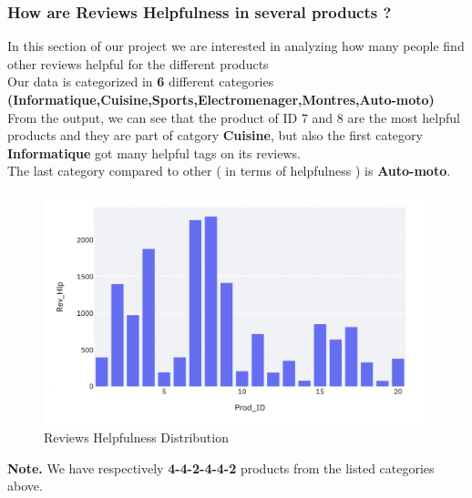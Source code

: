 \documentclass{article}
\begin{document}
\subsubsection{How are Reviews Helpfulness in several products ? }
In this section of our project we are interested in analyzing how many people find other reviews helpful for the different products\\
Our data is categorized in \textbf{6} different categories
\textbf{(Informatique,Cuisine,Sports,Electromenager,Montres,Auto-moto)}\\
From the output, we can see that the product of ID 7 and 8 are the most helpful products and they are part of catgory \textbf{Cuisine}, but also the first category \textbf{Informatique} got many helpful tags on its reviews.\\
The last category compared to other ( in terms of helpfulness ) is \textbf{Auto-moto}.
\begin{figure}[H]
    \centering
    \includegraphics[scale=0.55]{src/img/prod_rev_hlp.png}
    \caption{Reviews Helpfulness Distribution}
    \label{fig:my_label}
\end{figure}
\textbf{Note.} We have respectively \textbf{4-4-2-4-4-2} products from the listed categories above.
\newpage
\end{document}
